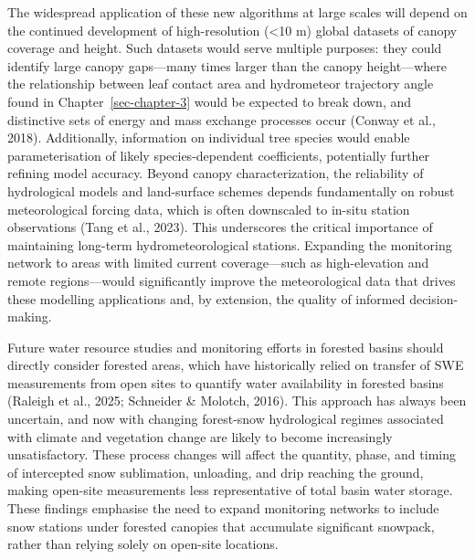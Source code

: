 \documentclass[
  letterpaper,
]{tex/uofsthesis-cs}
\begin{document}
The widespread application of these new algorithms at large scales will
depend on the continued development of high-resolution (\textless10 m)
global datasets of canopy coverage and height. Such datasets would serve
multiple purposes: they could identify large canopy gaps---many times
larger than the canopy height---where the relationship between leaf
contact area and hydrometeor trajectory angle found in
Chapter~\ref{sec-chapter-3} would be expected to break down, and
distinctive sets of energy and mass exchange processes occur (Conway et
al., 2018). Additionally, information on individual tree species would
enable parameterisation of likely species-dependent coefficients,
potentially further refining model accuracy. Beyond canopy
characterization, the reliability of hydrological models and
land-surface schemes depends fundamentally on robust meteorological
forcing data, which is often downscaled to in-situ station observations
(Tang et al., 2023). This underscores the critical importance of
maintaining long-term hydrometeorological stations. Expanding the
monitoring network to areas with limited current coverage---such as
high-elevation and remote regions---would significantly improve the
meteorological data that drives these modelling applications and, by
extension, the quality of informed decision-making.

Future water resource studies and monitoring efforts in forested basins
should directly consider forested areas, which have historically relied
on transfer of SWE measurements from open sites to quantify water
availability in forested basins (Raleigh et al., 2025; Schneider \&
Molotch, 2016). This approach has always been uncertain, and now with
changing forest-snow hydrological regimes associated with climate and
vegetation change are likely to become increasingly unsatisfactory.
These process changes will affect the quantity, phase, and timing of
intercepted snow sublimation, unloading, and drip reaching the ground,
making open-site measurements less representative of total basin water
storage. These findings emphasise the need to expand monitoring networks
to include snow stations under forested canopies that accumulate
significant snowpack, rather than relying solely on open-site locations.
\end{document}
